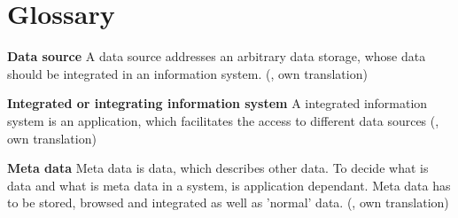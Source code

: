 \chapter{Glossary}

\textbf{Data source} A data source addresses an arbitrary data storage, whose data should be integrated in an information system. (\cite[p. 7]{DBLP:books/dp/LeserN2006}, own translation)

\textbf{Integrated or integrating information system} A integrated information system is an application, which facilitates the access to different data sources (\cite[p. 7]{DBLP:books/dp/LeserN2006}, own translation)

\textbf{Meta data} Meta data is data, which describes other data. To decide what is data and what is meta data in a system, is application dependant. Meta data has to be stored, browsed and integrated as well as 'normal' data. (\cite[p. 8]{DBLP:books/dp/LeserN2006}, own translation)